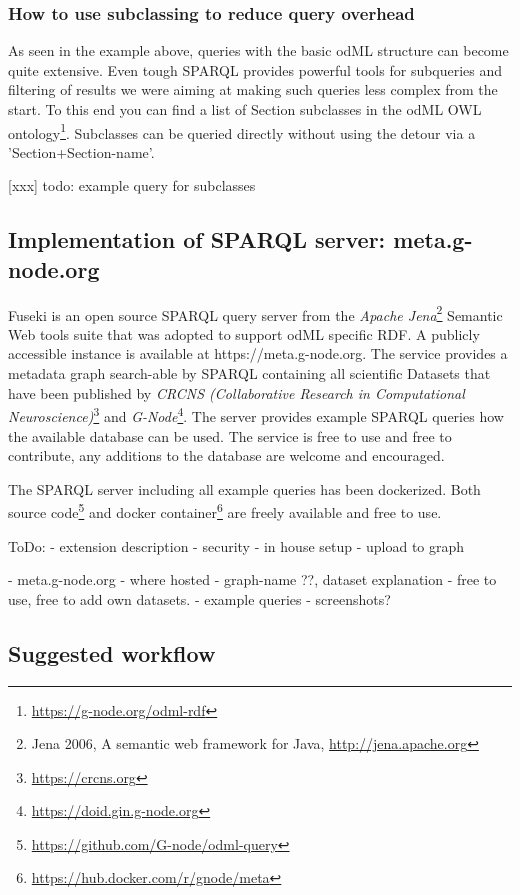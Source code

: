 \documentclass{article}
\begin{document}
\subsubsection{How to use subclassing to reduce query overhead} \label{sec:rdf_subclass_usage}

As seen in the example above, queries with the basic odML structure can become quite extensive. Even tough SPARQL provides powerful tools for subqueries and filtering of results we were aiming at making such queries less complex from the start. To this end you can find a list of Section subclasses in the odML OWL ontology\footnote{\url{https://g-node.org/odml-rdf}}. Subclasses can be queried directly without using the detour via a 'Section+Section-name'.

[xxx] todo: example query for subclasses

\subsection{Implementation of SPARQL server: meta.g-node.org} \label{sec:odml_query}

Fuseki is an open source SPARQL query server from the \textit{Apache Jena}\footnote{Jena 2006, A semantic web framework for Java, \url{http://jena.apache.org}} Semantic Web tools suite that was adopted to support odML specific RDF. A publicly accessible instance is available at https://meta.g-node.org. The service provides a metadata graph search-able by SPARQL containing all scientific Datasets that have been published by \textit{CRCNS (Collaborative Research in Computational Neuroscience)}\footnote{\url{https://crcns.org}} and \textit{G-Node}\footnote{\url{https://doid.gin.g-node.org}}. The server provides example SPARQL queries how the available database can be used. The service is free to use and free to contribute, any additions to the database are welcome and encouraged.

The SPARQL server including all example queries has been dockerized. Both source code\footnote{\url{https://github.com/G-node/odml-query}} and docker container\footnote{\url{https://hub.docker.com/r/gnode/meta}} are freely available and free to use.

ToDo:
- extension description
- security
- in house setup
- upload to graph

- meta.g-node.org
  - where hosted
  - graph-name ??, dataset explanation
  - free to use, free to add own datasets.
  - example queries
  - screenshots?

\subsection{Suggested workflow} \label{sec:odml_rdf_workflow}
\end{document}
